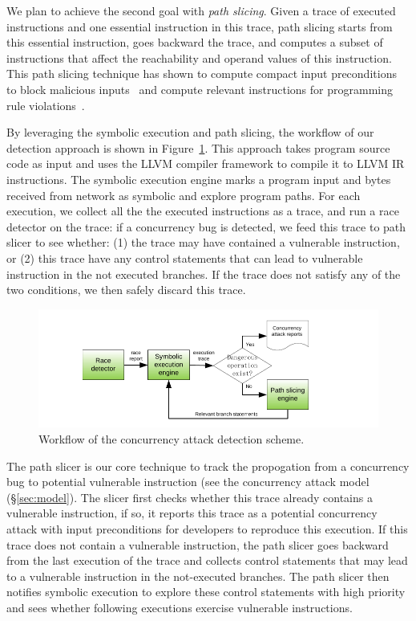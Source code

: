 We plan to achieve the second goal with \emph{path slicing}. Given a 
trace of executed instructions and one essential instruction in this trace, 
path slicing starts from this essential instruction, goes backward the trace, 
and computes a subset of instructions that affect the reachability and operand 
values of this instruction. This path slicing technique has shown to compute 
compact input preconditions to block malicious inputs~\cite{castro:bouncer} and 
compute relevant instructions for programming rule 
violations~\cite{woodpecker:asplos13}.

By leveraging the symbolic execution and path slicing, the workflow of our 
detection approach is shown in Figure~\ref{fig:detection}. This approach takes 
program source code as input and uses the LLVM compiler framework to compile it 
to LLVM IR instructions. The symbolic execution engine marks a program input 
and bytes received from network as symbolic and explore program paths. For each 
execution, we collect all the the executed instructions as a trace, and run a 
race detector on the trace: if a concurrency bug is detected, we feed this 
trace to path slicer to see whether: (1) the trace may have contained a 
vulnerable instruction, or (2) this trace have any control statements that can 
lead to vulnerable instruction in the not executed branches. If the trace does 
not satisfy any of the two conditions, we then safely discard this trace.

\begin{figure}[ht]
\centering
\includegraphics[width=0.5\columnwidth]{figures/detection}
\vspace{-.15in}
\caption{{Workflow of the concurrency attack detection scheme.}} 
\label{fig:detection}
\vspace{-.1in}
\end{figure}



The path slicer is our core technique to track the propogation from a 
concurrency bug to potential vulnerable instruction (see the concurrency attack 
model (\S\ref{sec:model}). The slicer first checks whether this trace already 
contains a vulnerable instruction, if so, it reports this trace as a potential 
concurrency attack with input preconditions for developers to reproduce this 
execution. If this trace does not contain a vulnerable instruction, the 
path slicer goes backward from the last execution of the trace and
collects control statements that may lead to a vulnerable instruction in the 
not-executed branches. The path slicer then notifies symbolic execution 
to explore these control statements with high priority and sees whether 
following executions exercise vulnerable instructions.

